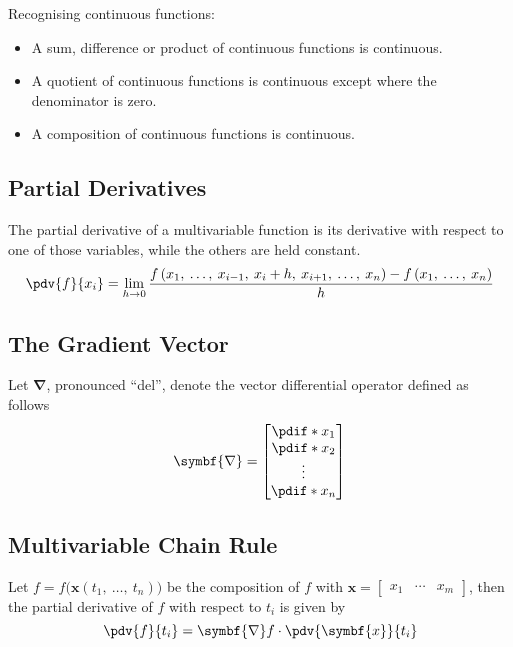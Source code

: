 \documentclass{article}
\begin{document}
Recognising continuous functions:
\begin{itemize}
    \item A sum, difference or product of continuous functions is
          continuous.
    \item A quotient of continuous functions is continuous except where
          the denominator is zero.
    \item A composition of continuous functions is continuous.
\end{itemize}
\subsection{Partial Derivatives}
\begin{definition}
    The partial derivative of a multivariable function is its derivative
    with respect to one of those variables, while the others are held
    constant.
    \begin{equation*}
        \pdv{f}{x_i} = \lim_{h \to 0} \frac{f\left( x_1,\: \ldots,\: x_{i-1},\: x_i+h,\: x_{i+1},\: \ldots,\: x_n \right) - f\left( x_1,\: \ldots,\: x_n \right)}{h}
    \end{equation*}
\end{definition}
\subsection{The Gradient Vector}
\begin{definition}
    Let \(\symbf{\nabla}\), pronounced ``del'', denote the vector
    differential operator defined as follows
    \begin{equation*}
        \symbf{\nabla} =
        \begin{bmatrix}
            \pdif*{x_1} \\
            \pdif*{x_2} \\
            \vdots      \\
            \pdif*{x_n}
        \end{bmatrix}
    \end{equation*}
\end{definition}
\subsection{Multivariable Chain Rule}
\begin{definition}
    Let \(f=f\bigl(\symbf{x}\left( t_1,\: \ldots,\: t_n \right)\bigr)\) be the
    composition of \(f\) with \(\symbf{x} =
    \begin{bmatrix}
        x_1 & \cdots & x_m
    \end{bmatrix}
    \),
    then the partial derivative of \(f\) with respect to \(t_i\) is
    given by
    \begin{equation*}
        \pdv{f}{t_i} = \symbf{\nabla}f \cdot \pdv{\symbf{x}}{t_i}
    \end{equation*}
\end{definition}
\end{document}
